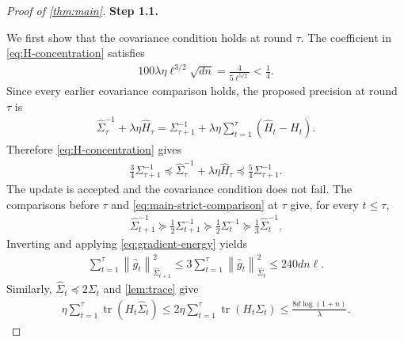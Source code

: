 \documentclass[11pt]{article}
\newcommand{\proofstepinline}[1]{%
    {\sffamily\bfseries\color{blue!55!black}Step #1.}\enspace
}
\newcommand{\tr}{\operatorname{tr}}
\newcommand{\1}{\mathbf 1}
\newcommand{\normm}[2]{\left\lVert #1\right\rVert_{#2}}
\begin{document}
\begin{proof}[Proof of \cref{thm:main}]
    \proofstepinline{1.1}
    We first show that the covariance condition holds at round $\tau$.
    The coefficient in \eqref{eq:H-concentration} satisfies
    \begin{align}
        100\lambda\eta\ell^{3/2}\sqrt{dn}
        =\frac{4}{5\ell^{5/2}}<\frac14.
        \label{eq:main-stability-H-small}
    \end{align}
    Since every earlier covariance comparison holds, the proposed
    precision at round $\tau$ is
    \begin{align}
        \widehat\Sigma_\tau^{-1}+\lambda\eta\widehat H_\tau
        =\Sigma_{\tau+1}^{-1}
        +\lambda\eta\sum_{t=1}^\tau(\widehat H_t-H_t).
    \end{align}
    Therefore \eqref{eq:H-concentration} gives
    \begin{align}
        \frac34\Sigma_{\tau+1}^{-1}
        \preceq
        \widehat\Sigma_\tau^{-1}+\lambda\eta\widehat H_\tau
        \preceq\frac54\Sigma_{\tau+1}^{-1}.
        \label{eq:main-strict-comparison}
    \end{align}
    The update is accepted and the covariance condition does not fail.
    The comparisons before $\tau$ and \eqref{eq:main-strict-comparison}
    at $\tau$ give, for every $t\leq\tau$,
    \begin{align}
        \widehat\Sigma_{t+1}^{-1}
        \succeq\frac12\Sigma_{t+1}^{-1}
        \succeq\frac12\Sigma_t^{-1}
        \succeq\frac13\widehat\Sigma_t^{-1}.
    \end{align}
    Inverting and applying \eqref{eq:gradient-energy} yields
    \begin{align}
        \sum_{t=1}^\tau\normm{\widehat g_t}{\widehat\Sigma_{t+1}}^2
        \leq3\sum_{t=1}^\tau\normm{\widehat g_t}{\widehat\Sigma_t}^2
        \leq240dn\ell.
        \label{eq:main-next-gradient-energy}
    \end{align}
    Similarly, $\widehat\Sigma_t\preceq2\Sigma_t$ and
    \cref{lem:trace} give
    \begin{align}
        \eta\sum_{t=1}^\tau\tr(H_t\widehat\Sigma_t)
        \leq2\eta\sum_{t=1}^\tau\tr(H_t\Sigma_t)
        \leq\frac{8d\log(1+n)}{\lambda}.
        \label{eq:main-stability-trace}
    \end{align}


\end{proof}
\end{document}
